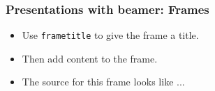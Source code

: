\begin{frame}
  \frametitle{Presentations with beamer: Frames}
  \begin{itemize}
    \item Use \texttt{frametitle} to give the frame a title.
    \item Then add content to the frame.
    \item The source for this frame looks like ...
  \end{itemize}
\end{frame}

